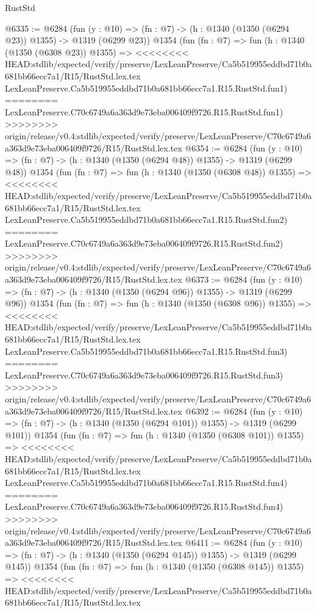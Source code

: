 \begin{lexlean}{RustStd}
\begin{coremodule}
{\begin{coremodule}
{{{{{{{{{{{{{{@6335 := @6284
    (fun (y : @10) => (fn : @7) -> (h : @1340 (@1350 (@6294 @23)) @1355) -> @1319 (@6299 @23))
    @1354
    (fun (fn : @7) =>
    fun (h : @1340 (@1350 (@6308 @23)) @1355) =>
<<<<<<<< HEAD:stdlib/expected/verify/preserve/LexLeanPreserve/Ca5b519955eddbd71b0a681bb66ecc7a1/R15/RustStd.lex.tex
    LexLeanPreserve.Ca5b519955eddbd71b0a681bb66ecc7a1.R15.RustStd.fun1)
========
    LexLeanPreserve.C70c6749a6a363d9e73eba006409f9726.R15.RustStd.fun1)
>>>>>>>> origin/release/v0.4:stdlib/expected/verify/preserve/LexLeanPreserve/C70c6749a6a363d9e73eba006409f9726/R15/RustStd.lex.tex
@6354 := @6284
    (fun (y : @10) => (fn : @7) -> (h : @1340 (@1350 (@6294 @48)) @1355) -> @1319 (@6299 @48))
    @1354
    (fun (fn : @7) =>
    fun (h : @1340 (@1350 (@6308 @48)) @1355) =>
<<<<<<<< HEAD:stdlib/expected/verify/preserve/LexLeanPreserve/Ca5b519955eddbd71b0a681bb66ecc7a1/R15/RustStd.lex.tex
    LexLeanPreserve.Ca5b519955eddbd71b0a681bb66ecc7a1.R15.RustStd.fun2)
========
    LexLeanPreserve.C70c6749a6a363d9e73eba006409f9726.R15.RustStd.fun2)
>>>>>>>> origin/release/v0.4:stdlib/expected/verify/preserve/LexLeanPreserve/C70c6749a6a363d9e73eba006409f9726/R15/RustStd.lex.tex
@6373 := @6284
    (fun (y : @10) => (fn : @7) -> (h : @1340 (@1350 (@6294 @96)) @1355) -> @1319 (@6299 @96))
    @1354
    (fun (fn : @7) =>
    fun (h : @1340 (@1350 (@6308 @96)) @1355) =>
<<<<<<<< HEAD:stdlib/expected/verify/preserve/LexLeanPreserve/Ca5b519955eddbd71b0a681bb66ecc7a1/R15/RustStd.lex.tex
    LexLeanPreserve.Ca5b519955eddbd71b0a681bb66ecc7a1.R15.RustStd.fun3)
========
    LexLeanPreserve.C70c6749a6a363d9e73eba006409f9726.R15.RustStd.fun3)
>>>>>>>> origin/release/v0.4:stdlib/expected/verify/preserve/LexLeanPreserve/C70c6749a6a363d9e73eba006409f9726/R15/RustStd.lex.tex
@6392 := @6284
    (fun (y : @10) => (fn : @7) -> (h : @1340 (@1350 (@6294 @101)) @1355) -> @1319 (@6299 @101))
    @1354
    (fun (fn : @7) =>
    fun (h : @1340 (@1350 (@6308 @101)) @1355) =>
<<<<<<<< HEAD:stdlib/expected/verify/preserve/LexLeanPreserve/Ca5b519955eddbd71b0a681bb66ecc7a1/R15/RustStd.lex.tex
    LexLeanPreserve.Ca5b519955eddbd71b0a681bb66ecc7a1.R15.RustStd.fun4)
========
    LexLeanPreserve.C70c6749a6a363d9e73eba006409f9726.R15.RustStd.fun4)
>>>>>>>> origin/release/v0.4:stdlib/expected/verify/preserve/LexLeanPreserve/C70c6749a6a363d9e73eba006409f9726/R15/RustStd.lex.tex
@6411 := @6284
    (fun (y : @10) => (fn : @7) -> (h : @1340 (@1350 (@6294 @145)) @1355) -> @1319 (@6299 @145))
    @1354
    (fun (fn : @7) =>
    fun (h : @1340 (@1350 (@6308 @145)) @1355) =>
<<<<<<<< HEAD:stdlib/expected/verify/preserve/LexLeanPreserve/Ca5b519955eddbd71b0a681bb66ecc7a1/R15/RustStd.lex.tex
}}}}}}}}}}}}}}
\end{coremodule}}
\end{coremodule}
\end{lexlean}
